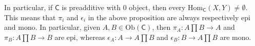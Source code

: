 \begin{cor}
	In particular, if $\mathsf{C}$ is preadditive with $0$ object, then every $\mathrm{Hom}_{\mathsf{C}} \left( X, Y \right) \neq \emptyset$.
	This means that $\pi_i$ and $\epsilon_i$ in the above proposition are always respectively epi and mono.
	In particular, given $A, B \in \mathrm{Ob} \left(\mathsf{C}\right)$, then 
	$\pi_A\colon A \prod B \to A$ and $\pi_B\colon A \prod B \to B$ are epi, whereas
	$\epsilon_A\colon A \to A \prod B$ and $\epsilon_B\colon B \to A \prod B$ are mono.
\end{cor} 

